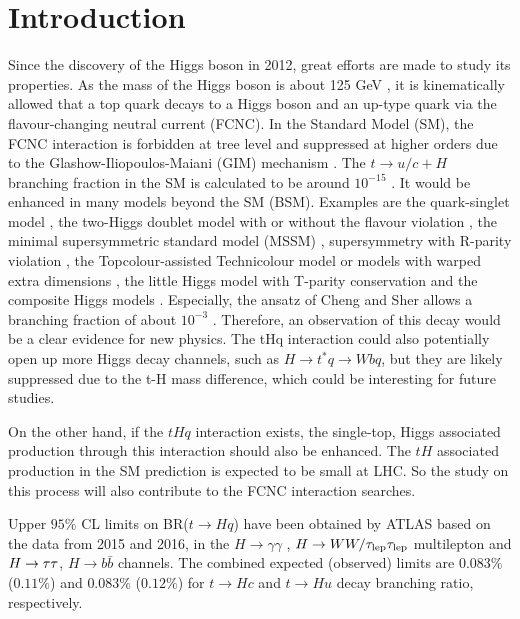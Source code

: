 \section{Introduction}
\label{sec:intro}
Since the discovery of the Higgs boson in 2012, great efforts are made to study its properties. As the mass of the Higgs boson is about 125 GeV \cite{HiggsMass}, it is kinematically allowed that a top quark decays to a Higgs boson and an up-type quark via the flavour-changing neutral current (FCNC). In the Standard Model (SM), the FCNC interaction is forbidden at tree level and suppressed at higher orders due to the Glashow-Iliopoulos-Maiani (GIM) mechanism \cite{GIM}. The $t\to u/c+H$ branching fraction in the SM is calculated to be around $10^{-15}$ \cite{brtch3}. It would be enhanced in many models beyond the SM (BSM). Examples are the quark-singlet model \cite{quarkSinglet1,quarkSinglet2}, the two-Higgs doublet model with or without the flavour violation \cite{2hdm1,2hdm2}, the minimal supersymmetric standard model (MSSM) \cite{2hdm3}, supersymmetry with R-parity violation \cite{Rparity},
the Topcolour-assisted Technicolour model \cite{Techni} or models with warped extra dimensions \cite{extraD}, the little Higgs model with T-parity conservation \cite{littleH} and the composite Higgs models \cite{compositeH}.
Especially, the ansatz of Cheng and Sher \cite{Sher} allows a branching fraction of about $10^{-3}$ \cite{FCNC_rate}. Therefore, an observation of this decay would be a clear evidence for new physics. The tHq interaction could also potentially open up more Higgs decay channels,
such as $H\rightarrow t^*q\rightarrow Wbq$, but they are likely suppressed due to the t-H mass difference, which could be interesting for future studies.

On the other hand, if the $tHq$ interaction exists, the single-top, Higgs associated production through this interaction should also be enhanced. The $tH$ associated production in the SM prediction is expected to be small at LHC\cite{tHjb_production}. So the study on this process will also contribute to the FCNC interaction searches.

Upper $95\%$ CL limits on BR($t\to Hq$) have been obtained by ATLAS based on the data from 2015 and 2016, in the $H\to\gamma\gamma$ \cite{fcncgmgm}, $H\to WW/\tau_\text{lep}{}\tau_\text{lep}$ multilepton \cite{fcncml} and  $H \rightarrow \tau\tau$, $H\to b\bar{b}$ \cite{fcnctautau} channels. The combined expected (observed) limits are $0.083\%$ ($0.11\%$) and $0.083\%$ ($0.12\%$) for $t\to Hc$ and $t\to Hu$ decay branching ratio, respectively.


